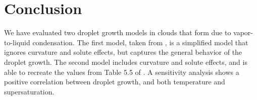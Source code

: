\documentclass[]{article}
\begin{document}
\section{Conclusion}
We have evaluated two droplet growth models in clouds that form due to
vapor-to-liquid condensation. The first model, taken from \cite{Curry}, is a
simplified model that ignores curvature and solute effects, but captures the
general behavior of the droplet growth. The second model includes curvature and
solute effects, and is able to recreate the values from Table 5.5 of
\cite{Curry}. A sensitivity analysis shows a positive correlation between droplet
growth, and both temperature and supersaturation.




\end{document}
